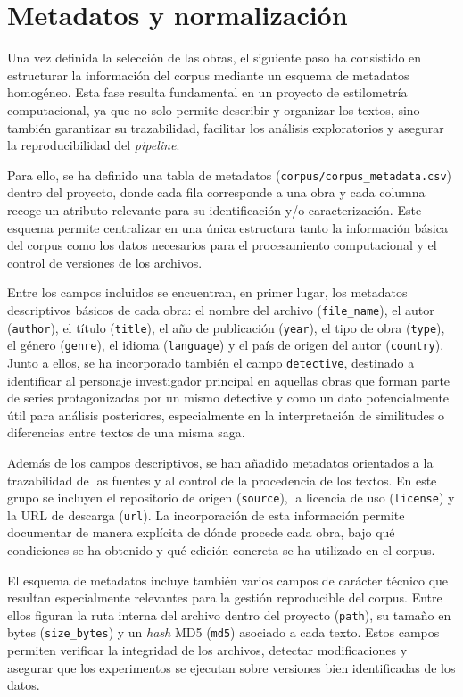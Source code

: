 \documentclass[IB]{TFUOC}%
\begin{document}
\section{Metadatos y normalización}

Una vez definida la selección de las obras, el siguiente paso ha consistido en estructurar la información del corpus mediante un esquema de metadatos homogéneo. Esta fase resulta fundamental en un proyecto de estilometría computacional, ya que no solo permite describir y organizar los textos, sino también garantizar su trazabilidad, facilitar los análisis exploratorios y asegurar la reproducibilidad del \textit{pipeline}.

Para ello, se ha definido una tabla de metadatos (\texttt{corpus/corpus\_metadata.csv}) dentro del proyecto, donde cada fila corresponde a una obra y cada columna recoge un atributo relevante para su identificación y/o caracterización. Este esquema permite centralizar en una única estructura tanto la información básica del corpus como los datos necesarios para el procesamiento computacional y el control de versiones de los archivos.

Entre los campos incluidos se encuentran, en primer lugar, los metadatos descriptivos básicos de cada obra: el nombre del archivo (\texttt{file\_name}), el autor (\texttt{author}), el título (\texttt{title}), el año de publicación (\texttt{year}), el tipo de obra (\texttt{type}), el género (\texttt{genre}), el idioma (\texttt{language}) y el país de origen del autor (\texttt{country}). Junto a ellos, se ha incorporado también el campo \texttt{detective}, destinado a identificar al personaje investigador principal en aquellas obras que forman parte de series protagonizadas por un mismo detective y como un dato potencialmente útil para análisis posteriores, especialmente en la interpretación de similitudes o diferencias entre textos de una misma saga.

Además de los campos descriptivos, se han añadido metadatos orientados a la trazabilidad de las fuentes y al control de la procedencia de los textos. En este grupo se incluyen el repositorio de origen (\texttt{source}), la licencia de uso (\texttt{license}) y la URL de descarga (\texttt{url}). La incorporación de esta información permite documentar de manera explícita de dónde procede cada obra, bajo qué condiciones se ha obtenido y qué edición concreta se ha utilizado en el corpus.

El esquema de metadatos incluye también varios campos de carácter técnico que resultan especialmente relevantes para la gestión reproducible del corpus. Entre ellos figuran la ruta interna del archivo dentro del proyecto (\texttt{path}), su tamaño en bytes (\texttt{size\_bytes}) y un \textit{hash} MD5 (\texttt{md5}) asociado a cada texto. Estos campos permiten verificar la integridad de los archivos, detectar modificaciones y asegurar que los experimentos se ejecutan sobre versiones bien identificadas de los datos.
\end{document}
